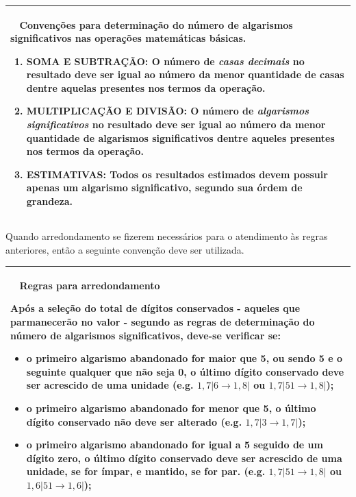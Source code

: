 \documentclass[a4paper, 11pt]{report}
\newenvironment{myboxed}
    {
        \begin{center}
        \begin{tabular}{p{0.7\textwidth}}
        \hline\
    }
    { 
        \\\hline
        \end{tabular} 
        \end{center}
    }
\begin{document}
\begin{myboxed}
    \textbf{Convenções para determinação do número de algarismos significativos 
    nas operações matemáticas básicas.}

    \begin{enumerate}
        \item \textbf{SOMA E SUBTRAÇÃO:} O número de \emph{casas decimais} no 
        resultado deve ser igual ao número da menor quantidade de casas dentre 
        aquelas presentes nos termos da operação.
        \item \textbf{MULTIPLICAÇÃO E DIVISÃO:} O número de \emph{algarismos 
        significativos} no resultado deve ser igual ao número da menor 
        quantidade de algarismos significativos dentre aqueles presentes nos 
        termos da operação.
        \item \textbf{ESTIMATIVAS:} Todos os resultados estimados devem possuir
        apenas um algarismo significativo, segundo sua órdem de grandeza. 
    \end{enumerate}
\end{myboxed}

Quando arredondamento se fizerem necessários para o atendimento às regras 
anteriores, então a seguinte convenção deve ser utilizada.

\begin{myboxed}
    \textbf{Regras para arredondamento}

    Após a seleção do total de dígitos conservados - aqueles que parmanecerão no 
    valor - segundo as regras de determinação do número de algarismos 
    significativos, deve-se verificar se:

    \begin{itemize}
        \item o primeiro algarismo abandonado for maior que 5, ou sendo 5 e 
        o seguinte qualquer que não seja 0, o último 
        dígito conservado deve ser acrescido de uma unidade  
        (e.g. $1,7|6 \rightarrow 1,8| $ ou $1,7|51 \rightarrow 1,8| $); 
        \item o primeiro algarismo abandonado for menor que 5, o último 
        dígito conservado não deve ser alterado 
        (e.g. $1,7|3 \rightarrow 1,7| $);
        \item  o primeiro algarismo abandonado for igual a 5 seguido de um 
        dígito zero, o último dígito conservado deve ser acrescido 
        de uma unidade, se for ímpar, e mantido, se for par.
        (e.g. $ 1,7|51 \rightarrow 1,8| $ ou $ 1,6|51 \rightarrow 1,6| $); 
    \end{itemize}
\end{myboxed}
\end{document}
